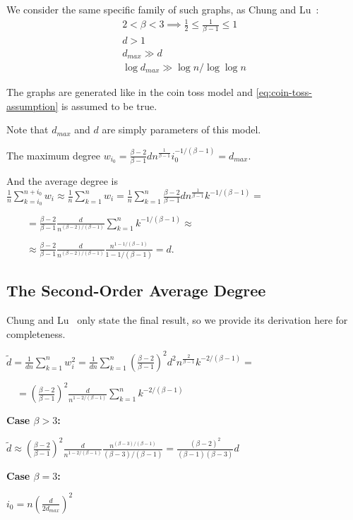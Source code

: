 We consider the same specific family of such graphs, as Chung and Lu~\cite{cl04}:
\begin{gather}
    2<\beta<3\implies\frac{1}{2}\leq\frac{1}{\beta-1}\leq 1\\
    d>1\\
    d_{max}\gg d\\
    \log d_{max}\gg \log n/\log\log n
\end{gather}

The graphs are generated like in the coin toss model
and \eqref{eq:coin-toss-assumption} is assumed to be true.

Note that $d_{max}$ and $d$ are simply parameters of this model.

The maximum degree $w_{i_0}=\frac{\beta-2}{\beta-1}dn^{\frac{1}{\beta-1}}i_0^{-1/(\beta-1)}=d_{max}$.

And the average degree is $\frac{1}{n}\sum_{k=i_0}^{n+i_0}{w_i}
\approx\frac{1}{n}\sum_{k=1}^{n}{w_i}
=\frac{1}{n}\sum_{k=1}^{n}{
    \frac{\beta-2}{\beta-1}dn^{\frac{1}{\beta-1}}k^{-1/(\beta-1)}
}=$

$\qquad=\frac{\beta-2}{\beta-1}\frac{d}{n^{(\beta-2)/(\beta-1)}}
\sum_{k=1}^{n}{k^{-1/(\beta-1)}}\approx$
    
$\qquad\approx\frac{\beta-2}{\beta-1}\frac{d}{n^{(\beta-2)/(\beta-1)}}
\frac{n^{1-1/(\beta-1)}}{1-1/(\beta-1)}=d$.

\subsection{The Second-Order Average Degree}

Chung and Lu~\cite{cl04} only state the final result, so we provide
its derivation here for completeness.

$\tilde{d}=\frac{1}{dn}\sum_{k=1}^{n}{w_i^2}
=\frac{1}{dn}\sum_{k=1}^{n}{
    \left(\frac{\beta-2}{\beta-1}\right)^2d^2n^{\frac{2}{\beta-1}}k^{-2/(\beta-1)}
}=$

$\quad=\left(\frac{\beta-2}{\beta-1}\right)^2\frac{d}{n^{1-2/(\beta-1)}}
\sum_{k=1}^{n}{k^{-2/(\beta-1)}}$

\textbf{Case $\beta>3$:}

$\tilde{d}\approx\left(\frac{\beta-2}{\beta-1}\right)^2\frac{d}{n^{1-2/(\beta-1)}}
\frac{n^{(\beta-3)/(\beta-1)}}{(\beta-3)/(\beta-1)}
=\frac{(\beta-2)^2}{(\beta-1)(\beta-3)}d$

\textbf{Case $\beta=3$:}

$i_0=n\left(\frac{d}{2d_{max}}\right)^2$

